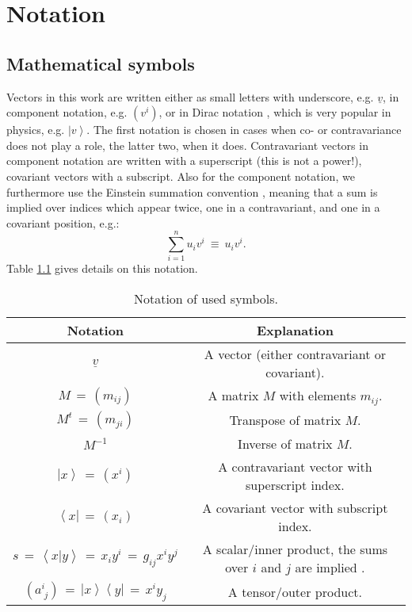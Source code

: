 %
%

\chapter{Notation}
\label{ch:notation}

\section{Mathematical symbols}
Vectors in this work are written either as small letters with underscore, e.g. $\underline{v}$, 
in component notation, e.g. $\left( v^i \right)$, or in Dirac notation \cite{wiki_braket}, which is 
very popular in physics, e.g. $\left| v \right>$. 
The first notation is chosen in cases when co- or contravariance does not play a role, 
the latter two, when it does. 
Contravariant vectors in component notation are written with a superscript (this is not a power!), 
covariant vectors with a subscript.
Also for the component notation, we furthermore use the Einstein summation convention \cite{wiki_summation},
meaning that a sum is implied over indices which appear twice, one in a contravariant, and one
in a covariant position, e.g.:
\begin{equation}
	\sum_{i=1}^{n} u_i v^i \ \equiv \ u_i v^i.
\end{equation}
Table \ref{tab:notation} gives details on this notation.

\begin{table}[htb]
	\centering
	\begin{tabular}{|c|c|}
		\hline
		\bf{Notation} & \bf{Explanation} \tabularnewline
		\hline
		$ \underline{v} $ & A vector (either contravariant or covariant). \tabularnewline
		\hline
		$ M \,=\, \left( m_{ij} \right) $ & A matrix $M$ with elements $m_{ij}$. \tabularnewline
		\hline
		$ M^t \,=\, \left( m_{ji} \right) $ & Transpose of matrix $M$. \tabularnewline
		\hline
		$ M^{-1} $ & Inverse of matrix $M$. \tabularnewline
		\hline
		$\left| x \right> \,=\, \left( x^i \right) $ & A contravariant vector with superscript index. \tabularnewline
		\hline
		$\left< x \right| \,=\, \left( x_i \right) $ & A covariant vector with subscript index. \tabularnewline
		\hline
		$s \,=\, \left< x | y \right> \,=\, x_i y^i \,=\, g_{ij} x^i y^j $ & A scalar/inner product, the sums over $i$ and $j$ are implied \cite{wiki_summation}. \tabularnewline
		\hline
		$\left(a^{i}_{\;j}\right) \,=\, \left| x \right> \left< y \right| \,=\, x^i y_j$ & A tensor/outer product. \tabularnewline
		\hline
	\end{tabular}
	\caption[Symbol notation.]{Notation of used symbols.}
	\label{tab:notation}
\end{table}


